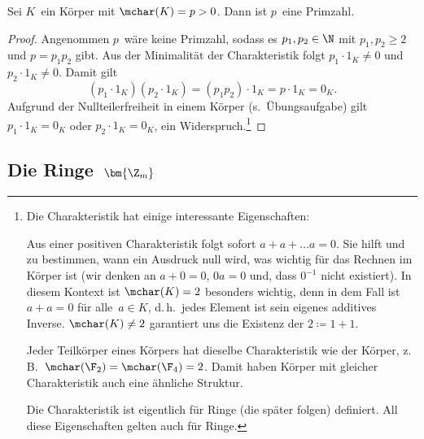 \documentclass[a4paper]{article}
\begin{document}
\begin{lemma}\label{lem:primechar}
    Sei $K$~ein Körper mit $\mchar(K) = p > 0$. Dann ist $p$~eine Primzahl.
\end{lemma}

\begin{proof}
    Angenommen $p$~wäre keine Primzahl, sodass es $p_1, p_2 \in \N$ mit $p_1, p_2 \geq 2$ und $p = p_1p_2$ gibt. Aus der Minimalität der Charakteristik folgt $p_1 \cdot 1_K \neq 0$ und $p_2 \cdot 1_K \neq 0$. Damit gilt
    \begin{equation*}
        (p_1 \cdot 1_K) (p_2 \cdot 1_K) = (p_1p_2) \cdot 1_K = p \cdot 1_K = 0_K.
    \end{equation*}
    Aufgrund der Nullteilerfreiheit in einem Körper (s.~Übungsaufgabe) gilt $p_1 \cdot 1_K = 0_K$ oder $p_2 \cdot 1_K = 0_K$, ein Widerspruch.\footnote{Die Charakteristik hat einige interessante Eigenschaften:

        Aus einer positiven Charakteristik folgt sofort $a + a + \dots a = 0$. Sie hilft und zu bestimmen, wann ein Ausdruck null wird, was wichtig für das Rechnen im Körper ist (wir denken an $a+0 = 0$, $0a = 0$ und, dass $0^{-1}$ nicht existiert). In diesem Kontext ist $\mchar(K) = 2$ besonders wichtig, denn in dem Fall ist $a + a = 0$ für alle~$a \in K$, d.\,h.\ jedes Element ist sein eigenes additives Inverse. $\mchar(K) \neq 2$ garantiert uns die Existenz der $2 \coloneqq 1+1$.

        Jeder Teilkörper eines Körpers hat dieselbe Charakteristik wie der Körper, z.\,B.\ $\mchar(\F_2) = \mchar(\F_4) = 2$. Damit haben Körper mit gleicher Charakteristik auch eine ähnliche Struktur.

        Die Charakteristik ist eigentlich für Ringe (die später folgen) definiert. All diese Eigenschaften gelten auch für Ringe.}
\end{proof}


\subsection{Die Ringe~\texorpdfstring{$\bm{\Z_m}$}{Zm}}
\end{document}
